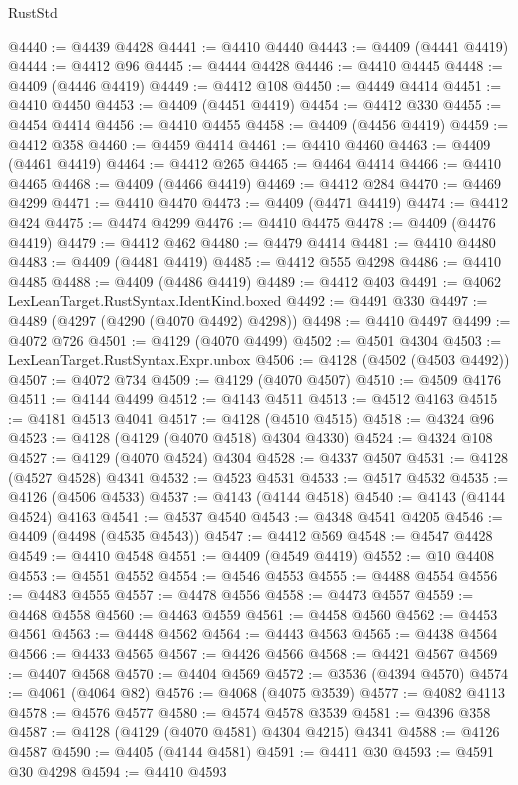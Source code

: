 \begin{lexlean}{RustStd}
\begin{coremodule}
@4440 := @4439 @4428
@4441 := @4410 @4440
@4443 := @4409 (@4441 @4419)
@4444 := @4412 @96
@4445 := @4444 @4428
@4446 := @4410 @4445
@4448 := @4409 (@4446 @4419)
@4449 := @4412 @108
@4450 := @4449 @4414
@4451 := @4410 @4450
@4453 := @4409 (@4451 @4419)
@4454 := @4412 @330
@4455 := @4454 @4414
@4456 := @4410 @4455
@4458 := @4409 (@4456 @4419)
@4459 := @4412 @358
@4460 := @4459 @4414
@4461 := @4410 @4460
@4463 := @4409 (@4461 @4419)
@4464 := @4412 @265
@4465 := @4464 @4414
@4466 := @4410 @4465
@4468 := @4409 (@4466 @4419)
@4469 := @4412 @284
@4470 := @4469 @4299
@4471 := @4410 @4470
@4473 := @4409 (@4471 @4419)
@4474 := @4412 @424
@4475 := @4474 @4299
@4476 := @4410 @4475
@4478 := @4409 (@4476 @4419)
@4479 := @4412 @462
@4480 := @4479 @4414
@4481 := @4410 @4480
@4483 := @4409 (@4481 @4419)
@4485 := @4412 @555 @4298
@4486 := @4410 @4485
@4488 := @4409 (@4486 @4419)
@4489 := @4412 @403
@4491 := @4062 LexLeanTarget.RustSyntax.IdentKind.boxed
@4492 := @4491 @330
@4497 := @4489 (@4297 (@4290 (@4070 @4492) @4298))
@4498 := @4410 @4497
@4499 := @4072 @726
@4501 := @4129 (@4070 @4499)
@4502 := @4501 @4304
@4503 := LexLeanTarget.RustSyntax.Expr.unbox
@4506 := @4128 (@4502 (@4503 @4492))
@4507 := @4072 @734
@4509 := @4129 (@4070 @4507)
@4510 := @4509 @4176
@4511 := @4144 @4499
@4512 := @4143 @4511
@4513 := @4512 @4163
@4515 := @4181 @4513 @4041
@4517 := @4128 (@4510 @4515)
@4518 := @4324 @96
@4523 := @4128 (@4129 (@4070 @4518) @4304 @4330)
@4524 := @4324 @108
@4527 := @4129 (@4070 @4524) @4304
@4528 := @4337 @4507
@4531 := @4128 (@4527 @4528) @4341
@4532 := @4523 @4531
@4533 := @4517 @4532
@4535 := @4126 (@4506 @4533)
@4537 := @4143 (@4144 @4518)
@4540 := @4143 (@4144 @4524) @4163
@4541 := @4537 @4540
@4543 := @4348 @4541 @4205
@4546 := @4409 (@4498 (@4535 @4543))
@4547 := @4412 @569
@4548 := @4547 @4428
@4549 := @4410 @4548
@4551 := @4409 (@4549 @4419)
@4552 := @10 @4408
@4553 := @4551 @4552
@4554 := @4546 @4553
@4555 := @4488 @4554
@4556 := @4483 @4555
@4557 := @4478 @4556
@4558 := @4473 @4557
@4559 := @4468 @4558
@4560 := @4463 @4559
@4561 := @4458 @4560
@4562 := @4453 @4561
@4563 := @4448 @4562
@4564 := @4443 @4563
@4565 := @4438 @4564
@4566 := @4433 @4565
@4567 := @4426 @4566
@4568 := @4421 @4567
@4569 := @4407 @4568
@4570 := @4404 @4569
@4572 := @3536 (@4394 @4570)
@4574 := @4061 (@4064 @82)
@4576 := @4068 (@4075 @3539)
@4577 := @4082 @4113
@4578 := @4576 @4577
@4580 := @4574 @4578 @3539
@4581 := @4396 @358
@4587 := @4128 (@4129 (@4070 @4581) @4304 @4215) @4341
@4588 := @4126 @4587
@4590 := @4405 (@4144 @4581)
@4591 := @4411 @30
@4593 := @4591 @30 @4298
@4594 := @4410 @4593

\end{coremodule}
\end{lexlean}
